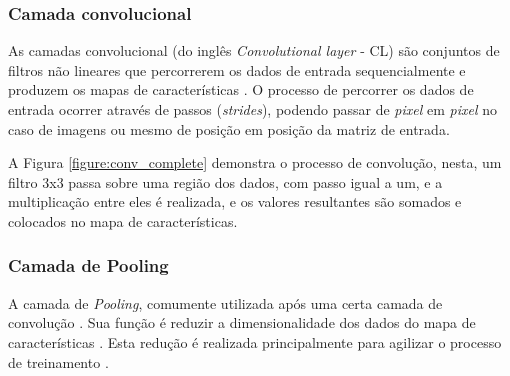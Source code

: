 


\subsubsection{Camada convolucional}

\par As camadas convolucional (do inglês \textit{Convolutional layer} - CL) são conjuntos de filtros não lineares que percorrerem os dados de entrada sequencialmente e produzem os mapas de características \cite{Miyazaki2017}. O processo de percorrer os dados de entrada ocorrer através de passos (\textit{strides}), podendo passar de \textit{pixel} em \textit{pixel} no caso de imagens ou mesmo de posição em posição da matriz de entrada.

\par A Figura \ref{figure:conv_complete} demonstra o processo de convolução, nesta, um filtro 3x3 passa sobre uma região dos dados, com passo igual a um, e a multiplicação entre eles é realizada, e os valores resultantes são somados e colocados no mapa de características.



\subsubsection{Camada de Pooling}

\par A camada de \textit{Pooling}, comumente utilizada após uma certa camada de convolução \cite{Caroline2016}. Sua função é reduzir a dimensionalidade dos dados do mapa de características \cite{Caroline2016}. Esta redução é realizada principalmente para agilizar o processo de treinamento \cite{Caroline2016}.

